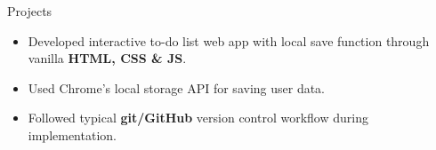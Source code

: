\documentclass{resume} %
\begin{document}
\begin{workSection}{Projects}
    
    
    \customItem[
        title=\href{https://github.com/AshkanArabim/todolist}{To Do List Web App \faExternalLink},
        duration=Fall 2022,
    ]
    \begin{itemize}
        \vspace{-0.5em}
        \itemsep -6pt {}
        \item Developed interactive to-do list web app with local save function through vanilla \textbf{HTML{,} CSS \& JS}.
        \item Used Chrome's local storage API for saving user data. %
        \item Followed typical \textbf{git/GitHub} version control workflow during implementation. %
    \end{itemize}
    

\end{workSection}
\end{document}
